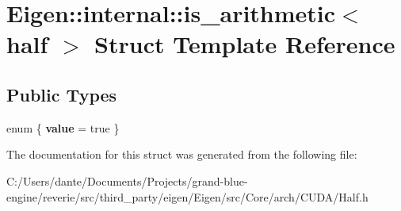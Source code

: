 \hypertarget{struct_eigen_1_1internal_1_1is__arithmetic_3_01half_01_4}{}\section{Eigen\+::internal\+::is\+\_\+arithmetic$<$ half $>$ Struct Template Reference}
\label{struct_eigen_1_1internal_1_1is__arithmetic_3_01half_01_4}
\subsection*{Public Types}
\begin{DoxyCompactItemize}
\item 
\mbox{\label{struct_eigen_1_1internal_1_1is__arithmetic_3_01half_01_4_ad4c8275a5f8ef9af0fa9b77fa80b0f8a}} 
enum \{ {\bfseries value} = true
 \}
\end{DoxyCompactItemize}


The documentation for this struct was generated from the following file\+:\begin{DoxyCompactItemize}
\item 
C\+:/\+Users/dante/\+Documents/\+Projects/grand-\/blue-\/engine/reverie/src/third\+\_\+party/eigen/\+Eigen/src/\+Core/arch/\+C\+U\+D\+A/Half.\+h\end{DoxyCompactItemize}
